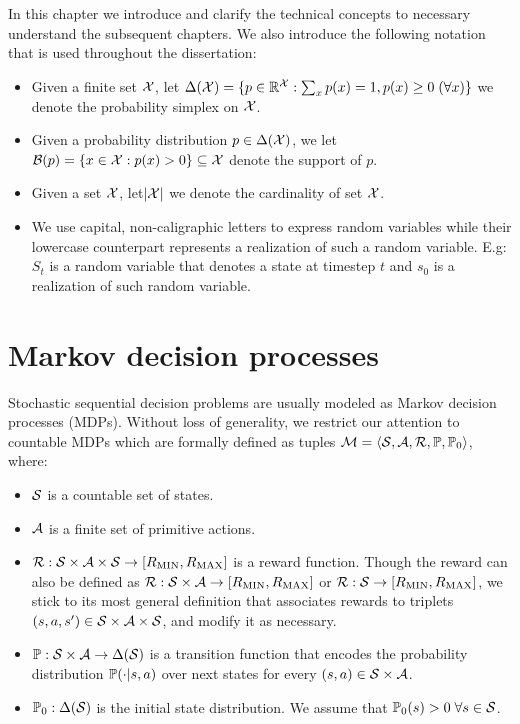 In this chapter we introduce and clarify the technical concepts to necessary understand the subsequent chapters. We also introduce the following notation that is used throughout the dissertation:
\begin{itemize}
  \item Given a finite set $\mathcal{X}$, let $\Delta(\mathcal{X})=\{p\in\mathbb{R}^{\mathcal{X}}:\sum_x p(x)=1, p(x)\geq 0\;(\forall x)\}$ we denote the probability simplex on $\mathcal{X}$. 
  \item Given a probability distribution $p\in\Delta(\mathcal{X})$, we let $\mathcal{B}(p)=\{x\in\mathcal{X}:p(x) > 0\}\subseteq\mathcal{X}$ denote the support of $p$.
  \item Given a set $\mathcal{X}$, let$\lvert\mathcal{X}\rvert$ we denote the cardinality of set $\mathcal{X}$.
  \item We use capital, non-caligraphic letters to express random variables while their lowercase counterpart represents a realization of such a random variable. E.g: $S_t$ is a random variable that denotes a state at timestep $t$ and $s_0$ is a realization of such random variable.
\end{itemize}
\section{Markov decision processes}
Stochastic sequential decision problems are usually modeled as Markov decision processes (MDPs). Without loss of generality, we restrict our attention to countable MDPs which are formally defined as tuples $\mathcal{M}=\langle\mathcal{S},\mathcal{A},\mathcal{R},\mathbb{P},\mathbb{P}_0\rangle$, where:
\begin{itemize}
  \item $\mathcal{S}$ is a countable set of states.
  \item $\mathcal{A}$ is a finite set of primitive actions.
  \item $\mathcal{R}:\mathcal{S}\times\mathcal{A}\times\mathcal{S}\rightarrow[R_\text{MIN}, R_\text{MAX}]$ is a reward function. Though the reward can also be defined as $\mathcal{R}:\mathcal{S}\times\mathcal{A}\rightarrow[R_\text{MIN}, R_\text{MAX}]$ or $\mathcal{R}:\mathcal{S}\rightarrow[R_\text{MIN}, R_\text{MAX}]$, we stick to its most general definition that associates rewards to triplets $(s, a, s')\in\mathcal{S}\times\mathcal{A}\times\mathcal{S}$, and modify it as necessary.
  \item $\mathbb{P}:\mathcal{S}\times\mathcal{A}\rightarrow\Delta(\mathcal{S})$ is a transition function that encodes the probability distribution $\mathbb{P}(\cdot\lvert s, a)$ over next states for every $(s, a)\in\mathcal{S}\times\mathcal{A}$.
  \item $\mathbb{P}_0:\Delta(\mathcal{S})$ is the initial state distribution. We assume that $\mathbb{P}_0(s)>0\;\forall s\in\mathcal{S}$.
\end{itemize}

